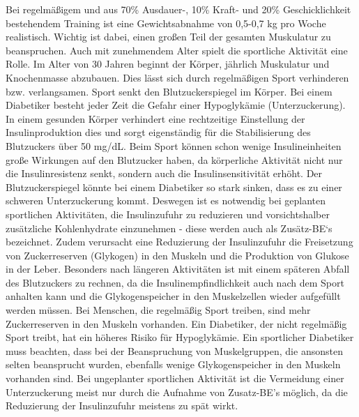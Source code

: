 	Bei regelmäßigem und aus 70\% Ausdauer-, 10\% Kraft- und 20\% Geschicklichkeit bestehendem Training ist eine Gewichtsabnahme von 0,5-0,7 kg pro Woche realistisch. Wichtig ist dabei, einen großen Teil der gesamten Muskulatur zu beanspruchen.\newline
	Auch mit zunehmendem Alter spielt die sportliche Aktivität eine Rolle. Im Alter von 30 Jahren beginnt der Körper, jährlich Muskulatur und Knochenmasse abzubauen. Dies lässt sich durch regelmäßigen Sport verhinderen bzw. verlangsamen.\newline
	Sport senkt den Blutzuckerspiegel im Körper. Bei einem Diabetiker besteht jeder Zeit die Gefahr einer Hypoglykämie (Unterzuckerung). In einem gesunden Körper verhindert eine rechtzeitige Einstellung der Insulinproduktion dies und sorgt eigenständig für die Stabilisierung des Blutzuckers über 50 mg/dL. \cite{SG}\newline
	Beim Sport können schon wenige Insulineinheiten große Wirkungen auf den Blutzucker haben, da körperliche Aktivität nicht nur die Insulinresistenz senkt, sondern auch die Insulinsensitivität erhöht. Der Blutzuckerspiegel könnte bei einem Diabetiker so stark sinken, dass es zu einer schweren Unterzuckerung kommt. Deswegen ist es notwendig bei geplanten sportlichen Aktivitäten, die Insulinzufuhr zu reduzieren und vorsichtshalber zusätzliche Kohlenhydrate einzunehmen - diese werden auch als \glqq Zusätz-BE‘s\grqq{} bezeichnet. Zudem verursacht eine Reduzierung der Insulinzufuhr die Freisetzung von Zuckerreserven (Glykogen) in den Muskeln und die Produktion von Glukose in der Leber. Besonders nach längeren Aktivitäten ist mit einem späteren Abfall des Blutzuckers zu rechnen, da die Insulinempfindlichkeit auch nach dem Sport anhalten kann und die Glykogenspeicher in den Muskelzellen wieder aufgefüllt werden müssen. \cite{RP}\newline
	Bei Menschen, die regelmäßig Sport treiben, sind mehr Zuckerreserven in den Muskeln vorhanden. Ein Diabetiker, der nicht regelmäßig Sport treibt, hat ein höheres Risiko für Hypoglykämie. Ein sportlicher Diabetiker muss beachten, dass bei der Beanspruchung von Muskelgruppen, die ansonsten selten beansprucht wurden, ebenfalls wenige Glykogenspeicher in den Muskeln vorhanden sind. \newline
	Bei ungeplanter sportlichen Aktivität ist die Vermeidung einer Unterzuckerung meist nur durch die Aufnahme von Zusatz-BE’s möglich, da die Reduzierung der Insulinzufuhr meistens zu spät wirkt.\newline
